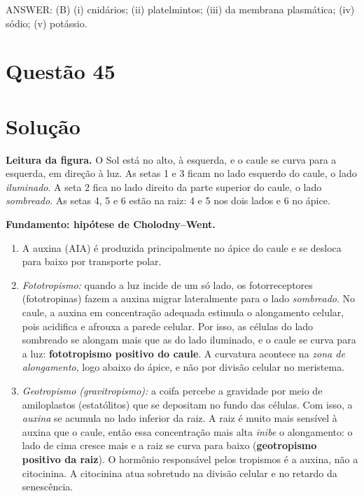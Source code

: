 \documentclass{article}%
\begin{document}
ANSWER: (B) (i) cnidários; (ii) platelmintos; (iii) da membrana plasmática; (iv) sódio; (v) potássio.%
\newpage%
\section*{Questão 45}

\section*{Solução}

\textbf{Leitura da figura.} O Sol está no alto, à esquerda, e o caule se curva para a esquerda, em direção à luz. As setas 1 e 3 ficam no lado esquerdo do caule, o lado \emph{iluminado}. A seta 2 fica no lado direito da parte superior do caule, o lado \emph{sombreado}. As setas 4, 5 e 6 estão na raiz: 4 e 5 nos dois lados e 6 no ápice.

\textbf{Fundamento: hipótese de Cholodny--Went.}
\begin{enumerate}
\item A auxina (AIA) é produzida principalmente no ápice do caule e se desloca para baixo por transporte polar.
\item \emph{Fototropismo:} quando a luz incide de um só lado, os fotorreceptores (fototropinas) fazem a auxina migrar lateralmente para o lado \emph{sombreado}. No caule, a auxina em concentração adequada estimula o alongamento celular, pois acidifica e afrouxa a parede celular. Por isso, as células do lado sombreado se alongam mais que as do lado iluminado, e o caule se curva para a luz: \textbf{fototropismo positivo do caule}. A curvatura acontece na \emph{zona de alongamento}, logo abaixo do ápice, e não por divisão celular no meristema.
\item \emph{Geotropismo (gravitropismo):} a coifa percebe a gravidade por meio de amiloplastos (estatólitos) que se depositam no fundo das células. Com isso, a \emph{auxina} se acumula no lado inferior da raiz. A raiz é muito mais sensível à auxina que o caule, então essa concentração mais alta \emph{inibe} o alongamento: o lado de cima cresce mais e a raiz se curva para baixo (\textbf{geotropismo positivo da raiz}). O hormônio responsável pelos tropismos é a auxina, não a citocinina. A citocinina atua sobretudo na divisão celular e no retardo da senescência.
\end{enumerate}
\end{document}
